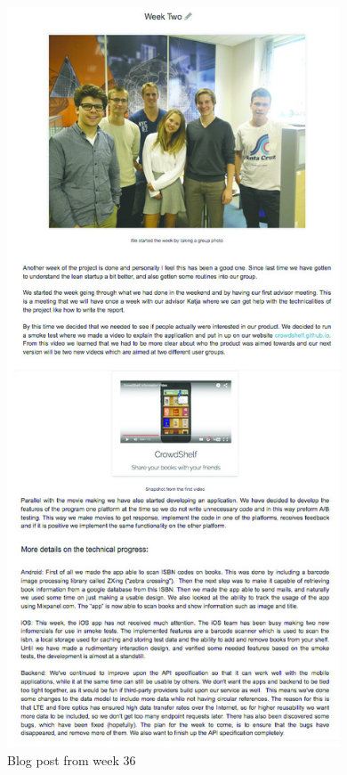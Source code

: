 \begin{figure}
\centering
\includegraphics[height=22cm]{figs/v01/WeekTwo.jpg}
\caption{Blog post from week 36}
\label{fig:week-two}
\end{figure}

